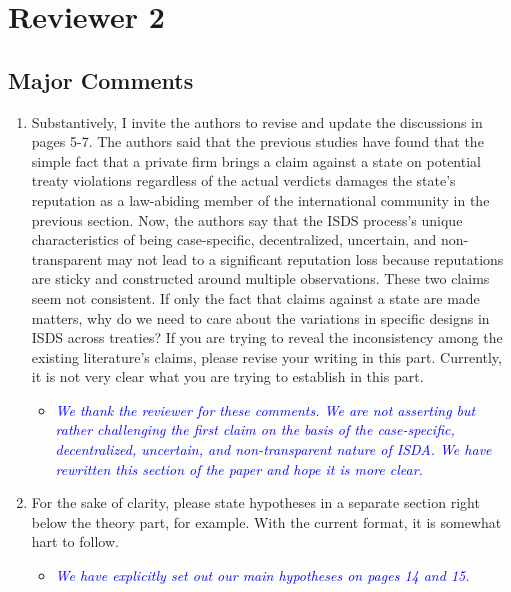 \section{Reviewer 2}

\subsection{Major Comments}

\begin{enumerate}
	\item Substantively, I invite the authors to revise and update the discussions in pages 5-7. The authors said that the previous studies have found that the simple fact that a private firm brings a claim against a state on potential treaty violations regardless of the actual verdicts damages the state’s reputation as a law-abiding member of the international community in the previous section. Now, the authors say that the ISDS process’s unique characteristics of being case-specific, decentralized, uncertain, and non-transparent may not lead to a significant reputation loss because reputations are sticky and constructed around multiple observations. These two claims seem not consistent. If only the fact that claims against a state are made matters, why do we need to care about the variations in specific designs in ISDS across treaties? If you are trying to reveal the inconsistency among the existing literature’s claims, please revise your writing in this part. Currently, it is not very clear what you are trying to establish in this part.
	\begin{itemize}
		\item \textcolor{blue}{ \emph{ 
		We thank the reviewer for these comments. We are not asserting but rather challenging the first claim on the basis of the case-specific, decentralized, uncertain, and non-transparent nature of ISDA. We have rewritten this section of the paper and hope it is more clear.
		}}
	\end{itemize}
	\item For the sake of clarity, please state hypotheses in a separate section right below the theory part, for example. With the current format, it is somewhat hart to follow.	
	\begin{itemize}
		\item \textcolor{blue}{ \emph{
		We have explicitly set out our main hypotheses on pages 14 and 15.		
		}}
	\end{itemize}

\end{enumerate}
